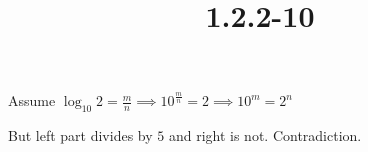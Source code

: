 \documentclass{article}
\title{1.2.2-10}
\begin{document}
\maketitle

Assume \( \log_{10} 2 = \frac{m}{n} \implies 10^{\frac{m}{n}} = 2 \implies 10^m = 2^n \)

But left part divides by \( 5 \) and right is not. Contradiction.
\end{document}
